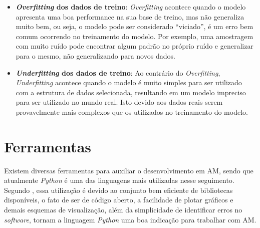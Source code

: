 \begin{itemize}
    \item \textbf{\textit{Overfitting} dos dados de treino}: \textit{Overfitting} acontece quando o modelo apresenta uma boa performance na sua base de treino, mas não generaliza muito bem, ou seja, o modelo pode ser considerado “viciado”, é um erro bem comum ocorrendo no treinamento do modelo. Por exemplo, uma amostragem com muito ruído pode encontrar algum padrão no próprio ruído e generalizar para o mesmo, não generalizando para novos dados.
    \item \textbf{\textit{Underfitting} dos dados de treino}: Ao contrário do \textit{Overfitting}, \textit{Underfitting} acontece quando o modelo é muito simples para ser utilizado com a estrutura de dados selecionada, resultando em um modelo impreciso para ser utilizado no mundo real. Isto devido aos dados reais serem provavelmente mais complexos que os utilizados no treinamento do modelo.
\end{itemize}

\section{Ferramentas}
\label{sec:MAFerramentas}
Existem diversas ferramentas para auxiliar o desenvolvimento em AM, sendo que atualmente \textit{Python} é uma das linguagens mais utilizadas nesse seguimento. Segundo , essa utilização é devido ao conjunto bem eficiente de bibliotecas disponíveis, o fato de ser de código aberto, a facilidade de plotar gráficos e demais esquemas de visualização, além da simplicidade de identificar erros no \textit{software}, tornam a linguagem \textit{Python} uma boa indicação para trabalhar com AM.

